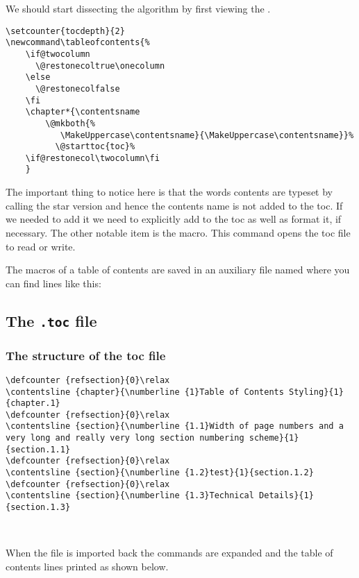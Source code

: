 We should start dissecting the algorithm by first viewing the .

\begin{tcolorbox}{}
\begin{lstlisting}
\setcounter{tocdepth}{2}
\newcommand\tableofcontents{%
    \if@twocolumn
      \@restonecoltrue\onecolumn
    \else
      \@restonecolfalse
    \fi
    \chapter*{\contentsname
        \@mkboth{%
           \MakeUppercase\contentsname}{\MakeUppercase\contentsname}}%
          \@starttoc{toc}%
    \if@restonecol\twocolumn\fi
    }
\end{lstlisting}
\end{tcolorbox}

The important thing to notice here is that the words contents are typeset by calling the star version and hence the contents name is not added to the toc. If we needed to add it we need to explicitly add to the toc as well as format it, if necessary. The other notable item is the  macro. This command opens the toc file to read or write.

The macros of a table of contents are saved in an auxiliary file named  where you can find lines like this:

\subsection{The \texttt{.toc} file}
\subsubsection{The structure of the toc file}

\begin{lstlisting}
\defcounter {refsection}{0}\relax
\contentsline {chapter}{\numberline {1}Table of Contents Styling}{1}{chapter.1}
\defcounter {refsection}{0}\relax
\contentsline {section}{\numberline {1.1}Width of page numbers and a very long and really very long section numbering scheme}{1}{section.1.1}
\defcounter {refsection}{0}\relax
\contentsline {section}{\numberline {1.2}test}{1}{section.1.2}
\defcounter {refsection}{0}\relax
\contentsline {section}{\numberline {1.3}Technical Details}{1}{section.1.3}
\end{lstlisting}
\

When the file is imported back the commands are expanded and the table of contents lines printed as shown below.



